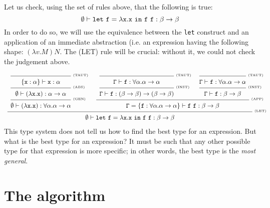 \def\th{\vdash}
\def\fun{\rightarrow}
\def\infrule{\begin{array}[b]{c}}
\def\endinfrule{\end{array}}
\def\imply#1{\\[-1.2ex]\hrulefill\hbox to 0pt{~\tiny (#1)\hss}\\}
\def\topimply#1{\hrulefill\hbox to 0pt{~\tiny (#1)\hss}\\}
\def\andalso{\qquad\quad}

\Example
Let us check, using the set of rules above, that the following is true:
$$ \emptyset \th \tt let~f = \lambda x. x ~ in ~ f ~ f : \beta \fun \beta $$
In order to do so, we will use the equivalence between the {\tt let}
construct and an  application of an immediate abstraction (i.e. an 
expression having the following shape: $(\lambda v . M) N$. The (LET) rule 
will be crucial: without it, we could not check the judgement above.
{\small
$$
\begin{infrule}
\begin{infrule}
\topimply{TAUT}
\tt \{x:\alpha\} \th x : \alpha
\imply{ABS}
\tt \emptyset \th (\lambda x.x) : \alpha \fun \alpha
\imply{GEN}
\tt \emptyset \th (\lambda x.x) : \forall \alpha. \alpha \fun \alpha
\end{infrule}
\andalso
\begin{infrule}
\begin{infrule}
\topimply{TAUT}
\tt \Gamma \th f : \forall \alpha. \alpha \fun \alpha
\imply{INST}
\tt \Gamma \th f : (\beta \fun \beta) \fun (\beta \fun \beta)
\end{infrule}
\andalso
\begin{infrule}
\topimply{TAUT}
\tt \Gamma \th f : \forall \alpha. \alpha \fun \alpha
\imply{INST}
\tt \Gamma \th f : \beta \fun \beta
\end{infrule}
\imply{APP}
\tt \Gamma = \{f : \forall \alpha. \alpha \fun \alpha\} \th f~f: \beta \fun \beta
\end{infrule}
\imply{LET}
\tt \emptyset \th \tt let~f = \lambda x. x ~ in ~ f ~ f : \beta \fun \beta
\end{infrule}
$$
}
\End
This type system does not tell us how to find the best type for an
expression. But what is the best type for an expression? It must be such
that any other possible type for that expression is more specific; in
other words, the best type is the {\em most general}.

\section{The algorithm}
%

